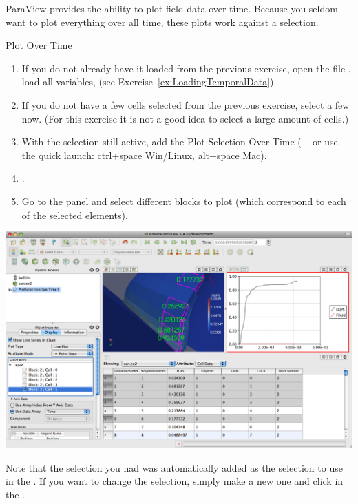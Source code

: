 ParaView provides the ability to plot field data over time.  Because you
seldom want to plot everything over all time, these plots work against a
selection.

\begin{exercise}{Plot Over Time}
  \label{ex:PlotOverTime}
  \begin{enumerate}
  \item If you do not already have it loaded from the previous exercise,
    open the file , load all variables, \apply (see
    Exercise~\ref{ex:LoadingTemporalData}).
  \item If you do not have a few cells selected from the previous exercise,
    select a few now. (For this exercise it is not a good idea to select a
    large amount of cells.)
  \item With the selection still active, add the Plot Selection Over Time
    ( \ra {} \ra {}~ or use the quick launch: ctrl+space
    Win/Linux, alt+space Mac). 
  \item \apply.
  \item Go to the  panel and select different blocks to plot
    (which correspond to each of the selected elements).
  \end{enumerate}

  \begin{inlinefig}
    \includegraphics[width=\scw]{images/PlotSelectionOverTime}
  \end{inlinefig}

  Note that the selection you had was automatically added as the selection
  to use in the .  If you want to change the
  selection, simply make a new one and click  in
  the .
\end{exercise}

